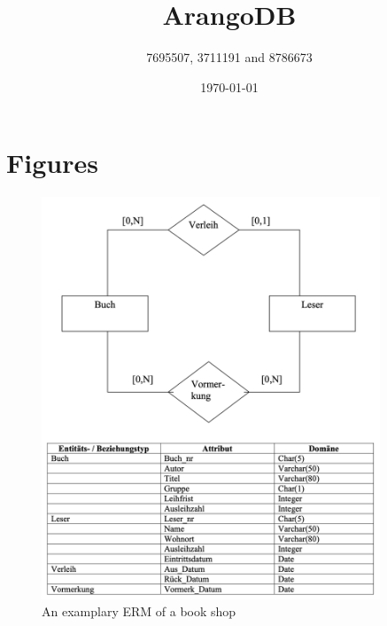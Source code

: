 \documentclass[a4paper,doc]{apa6}
\title{ArangoDB}
\date{\today}
\author{7695507, 3711191 and 8786673}
\affiliation{New DB Technologies -- Duale Hochschule Baden-Württemberg, Stuttgart}
\begin{document}
\maketitle

\tableofcontents



\appendix

\section{Figures}
\begin{figure}[h]
  \centering
  \includegraphics[width=0.9\textwidth]{images/erm.png}
  \caption{An examplary ERM of a book shop}
  \label{fig:book_shop_erm}
\end{figure}

\newpage
\printnoidxglossary[type=\acronymtype,numberedsection=autolabel]

\newpage
\printbibliography{}
\end{document}
